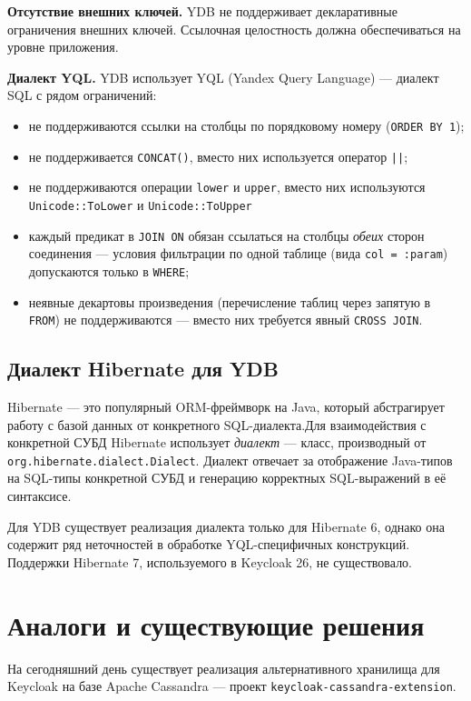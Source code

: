 \documentclass[times]{itmo-student-thesis}
\begin{document}
\textbf{Отсутствие внешних ключей.} YDB не поддерживает декларативные ограничения внешних ключей.
Ссылочная целостность должна обеспечиваться на уровне приложения.

\textbf{Диалект YQL.} YDB использует YQL (Yandex Query Language) --- диалект SQL с рядом ограничений:

\begin{itemize}
    \item не поддерживаются ссылки на столбцы по порядковому номеру (\texttt{ORDER BY 1});
    \item не поддерживается \texttt{CONCAT()}, вместо них используется оператор \texttt{||};
    \item не поддерживаются операции \texttt{lower} и \texttt{upper}, вместо них используются \texttt{Unicode::ToLower} и \texttt{Unicode::ToUpper}
    \item каждый предикат в \texttt{JOIN ON} обязан ссылаться на столбцы
    \textit{обеих} сторон соединения --- условия фильтрации по одной таблице
    (вида \texttt{col = :param}) допускаются только в \texttt{WHERE};
    \item неявные декартовы произведения (перечисление таблиц через запятую в \texttt{FROM}) не поддерживаются ---
    вместо них требуется явный \texttt{CROSS JOIN}.
\end{itemize}

\subsection{Диалект Hibernate для YDB}

Hibernate --- это популярный ORM-фреймворк на Java, который абстрагирует работу с базой данных от 
конкретного SQL-диалекта.Для взаимодействия с конкретной СУБД Hibernate использует \textit{диалект} ---
класс, производный от \texttt{org.hibernate.dialect.Dialect}.
Диалект отвечает за отображение Java-типов на SQL-типы конкретной СУБД
и генерацию корректных SQL-выражений в её синтаксисе.

Для YDB существует реализация диалекта только для Hibernate 6, однако она содержит
ряд неточностей в обработке YQL-специфичных конструкций.
Поддержки Hibernate 7, используемого в Keycloak 26, не существовало.

\section{Аналоги и существующие решения}

На сегодняшний день существует реализация альтернативного хранилища для Keycloak на базе
Apache Cassandra --- проект \texttt{keycloak-cassandra-extension}.
\end{document}
